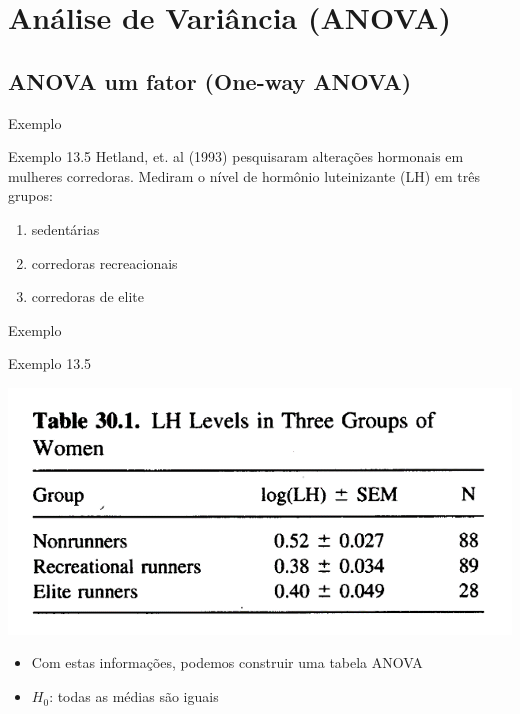 \documentclass{beamer}
\begin{document}

\section[ANOVA]{Análise de Variância (ANOVA)}

\subsection{ANOVA um fator (One-way ANOVA)}

\begin{frame}[label=exemplo13.5]{Exemplo}
  \begin{exampleblock}{Exemplo 13.5}
    Hetland, et. al (1993) pesquisaram alterações hormonais em mulheres corredoras.
    Mediram o nível de hormônio luteinizante (LH) em três grupos:
    \begin{enumerate}
    \item sedentárias
    \item corredoras recreacionais
    \item corredoras de elite
    \end{enumerate}
  \end{exampleblock}
\end{frame}

\begin{frame}{Exemplo}
  \begin{exampleblock}{Exemplo 13.5}
    \begin{center}
      \includegraphics[width=.6\textwidth]{Topicos_adv/exemplo13_5-1}
    \end{center}
  \begin{itemize}
  \item Com estas informações, podemos construir uma tabela ANOVA
  \item $H_0$: todas as médias são iguais
  \end{itemize}
  \end{exampleblock}
\end{frame}
\end{document}
